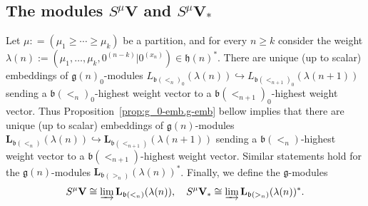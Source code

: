 \documentclass[12pt]{amsart}
\newcommand\g{\mathfrak{g}}
\newcommand\fh{\mathfrak{h}}
\newcommand\fb{\mathfrak{b}}
\newcommand\bV{\mathbf{V}}
\newcommand\bL{\mathbf{L}}
\theoremstyle{plain}
\theoremstyle{definition}
\numberwithin{equation}{section}
\begin{document}
\subsection*{The modules $S^\mu \bV$ and $S^\mu \bV_*$} 
Let $\mu : = (\mu_1\geq \cdots \geq \mu_k)$ be a partition, and for every $n\geq k$ consider the weight $\lambda(n):=(\mu_1, \ldots, \mu_k, 0^{(n-k)}|0^{(x_n)})\in \fh(n)^*$. There are unique (up to scalar) embeddings of $\g(n)_0$-modules $L_{\fb(<_n)_0}(\lambda(n))\hookrightarrow L_{\fb(<_{n+1})_0}(\lambda(n+1))$ sending a $\fb(<_n)_0$-highest weight vector to a $\fb(<_{n+1})_0$-highest weight vector. Thus Proposition~\ref{prop:g_0-emb.g-emb} bellow implies that there are unique (up to scalar) embeddings of $\g(n)$-modules $\bL_{\fb(<_n)}(\lambda(n))\hookrightarrow \bL_{\fb(<_{n+1})}(\lambda(n+1))$ sending a $\fb(<_n)$-highest weight vector to a $\fb(<_{n+1})$-highest weight vector. Similar statements hold for the $\g(n)$-modules $\bL_{\fb(>_n)}(\lambda(n))^*$. Finally, we define the $\g$-modules
	\[
S^\mu \bV\cong \varinjlim \bL_{\fb(<_n)}(\lambda(n)), \quad S^\mu \bV_*\cong \varinjlim \bL_{\fb(>_n)}(\lambda(n))^*.
	\]
\end{document}
